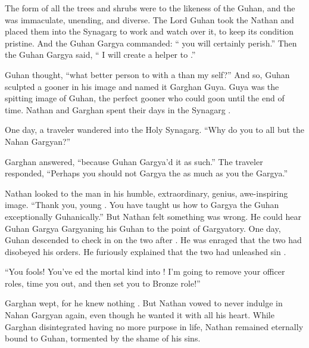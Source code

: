 \documentclass{article}
\begin{document}
The form of all the trees and shrubs were to the likeness of the Guhan, and the  was immaculate, unending, and diverse. The Lord Guhan took the Nathan and placed them into the Synagarg to work and watch over it, to keep its condition pristine. And the Guhan Gargya commanded: “ you will certainly perish.” Then the Guhan Gargya said, “ I will create a helper to .” 

Guhan thought, “what better person to  with a  than my  self?” And so, Guhan sculpted a gooner in his image and named it Garghan Guya. Guya was the spitting image of Guhan, the perfect gooner who could goon until the end of time. Nathan and Garghan spent their days in the Synagarg .

One day, a traveler wandered into the Holy Synagarg. “Why do you  to all but the Nahan Gargyan?”

Garghan answered, “because Guhan Gargya'd it as such.”
The traveler responded, “Perhaps you should not Gargya the  as much as you  the Gargya.”

Nathan looked to the man in his humble, extraordinary, genius, awe-inspiring image. “Thank you, young . You have taught us how to Gargya the Guhan exceptionally Guhanically.”
 But Nathan felt something was wrong. He could hear Guhan Gargya Gargyaning his Guhan to the point of Gargyatory.
One day, Guhan descended to check in on the two after . He was enraged that the two had disobeyed his orders. He furiously explained that the two had unleashed sin .

“You fools! You've ed the mortal kind into ! I'm going to remove your officer roles, time you out, and then set you to Bronze role!”

Garghan wept, for he knew nothing . But Nathan vowed to never indulge in Nahan Gargyan again, even though he wanted it with all his heart. While Garghan disintegrated having no more purpose in life, Nathan remained eternally bound to Guhan, tormented by the shame of his sins.
\end{document}

